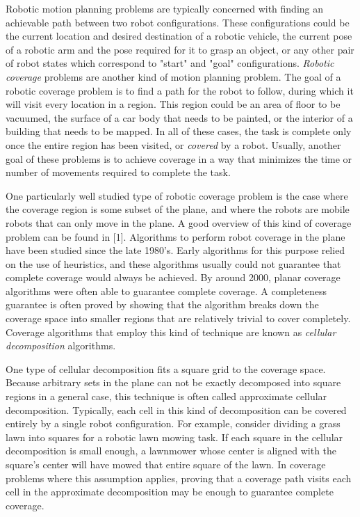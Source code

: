 \documentclass[letterpaper, 12pt, leqno]{report}
\begin{document}
Robotic motion planning problems are typically concerned with finding an achievable path between two robot configurations. These configurations could be the current location and desired destination of a robotic vehicle, the current pose of a robotic arm and the pose required for it to grasp an object, or any other pair of robot states which correspond to "start" and "goal" configurations. \textit{Robotic coverage} problems are another kind of motion planning problem. The goal of a robotic coverage problem is to find a path for the robot to follow, during which it will visit every location in a region. This region could be an area of floor to be vacuumed, the surface of a car body that needs to be painted, or the interior of a building that needs to be mapped. In all of these cases, the task is complete only once the entire region has been visited, or \textit{covered} by a robot. Usually, another goal of these problems is to achieve coverage in a way that minimizes the time or number of movements required to complete the task.

One particularly well studied type of robotic coverage problem is the case where the coverage region is some subset of the plane, and where the robots are mobile robots that can only move in the plane. A good overview of this kind of coverage problem can be found in [1]. Algorithms to perform robot coverage in the plane have been studied since the late 1980's. Early algorithms for this purpose relied on the use of heuristics, and these algorithms usually could not guarantee that complete coverage would always be achieved. By around 2000, planar coverage algorithms were often able to guarantee complete coverage. A completeness guarantee is often proved by showing that the algorithm breaks down the coverage space into smaller regions that are relatively trivial to cover completely. Coverage algorithms that employ this kind of technique are known as \textit{cellular decomposition} algorithms.

One type of cellular decomposition fits a square grid to the coverage space. Because arbitrary sets in the plane can not be exactly decomposed into square regions in a general case, this technique is often called approximate cellular decomposition. Typically, each cell in this kind of decomposition can be covered entirely by a single robot configuration. For example, consider dividing a grass lawn into squares for a robotic lawn mowing task. If each square in the cellular decomposition is small enough, a lawnmower whose center is aligned with the square's center will have mowed that entire square of the lawn. In coverage problems where this assumption applies, proving that a coverage path visits each cell in the approximate decomposition may be enough to guarantee complete coverage.
\end{document}
